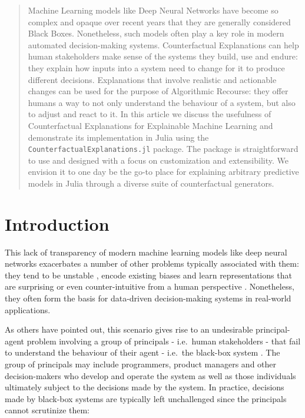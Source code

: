 \documentclass{juliacon}
\begin{document}


\maketitle

\begin{abstract}

Machine Learning models like Deep Neural Networks have become so complex and opaque over recent years that they are generally considered Black Boxes. Nonetheless, such models often play a key role in modern automated decision-making systems. Counterfactual Explanations can help human stakeholders make sense of the systems they build, use and endure: they explain how inputs into a system need to change for it to produce different decisions. Explanations that involve realistic and actionable changes can be used for the purpose of Algorithmic Recourse: they offer humans a way to not only understand the behaviour of a system, but also to adjust and react to it. In this article we discuss the usefulness of Counterfactual Explanations for Explainable Machine Learning and demonstrate its implementation in Julia using the \verb|CounterfactualExplanations.jl| package. The package is straightforward to use and designed with a focus on customization and extensibility. We envision it to one day be the go-to place for explaining arbitrary predictive models in Julia through a diverse suite of counterfactual generators.

\end{abstract}

\hypertarget{sec-intro}{%
\section{Introduction}\label{sec-intro}}

This lack of transparency of modern machine learning models like deep
neural networks exacerbates a number of other problems typically
associated with them: they tend to be unstable
\cite{goodfellow2014explaining}, encode existing biases
\cite{buolamwini2018gender} and learn representations that are
surprising or even counter-intuitive from a human perspective
\cite{sturm2014simple}. Nonetheless, they often form the basis for
data-driven decision-making systems in real-world applications.

As others have pointed out, this scenario gives rise to an undesirable
principal-agent problem involving a group of principals - i.e.~human
stakeholders - that fail to understand the behaviour of their agent -
i.e.~the black-box system \cite{borch2022machine}. The group of
principals may include programmers, product managers and other
decision-makers who develop and operate the system as well as those
individuals ultimately subject to the decisions made by the system. In
practice, decisions made by black-box systems are typically left
unchallenged since the principals cannot scrutinize them:
\end{document}
